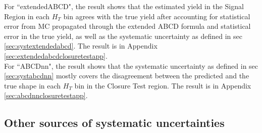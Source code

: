 \documentclass[twoside]{article}
\begin{document}
For ``extendedABCD", the result shows that the estimated yield in the Signal Region in each $H_T$ bin agrees with the true yield after accounting for statistical error from MC propagated through the extended ABCD formula and statistical error in the true yield, as well as the systematic uncertainty as defined in sec \ref{sec:systextendedabcd}. The result is in Appendix \ref{sec:extendedabcdclosuretestapp}.\\

For ``ABCDnn", the result shows that the systematic uncertainty as defined in sec \ref{sec:systabcdnn} mostly covers the disagreement between the predicted and the true shape in each $H_T$ bin in the Closure Test region. The result is in Appendix \ref{sec:abcdnnclosuretestapp}.\\

\subsection{Other sources of systematic uncertainties}
\end{document}
